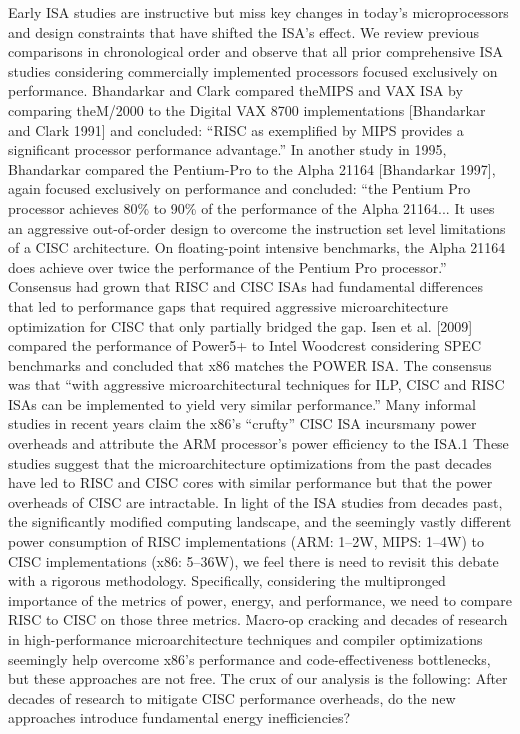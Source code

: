 Early ISA studies are instructive but miss key changes in today’s
microprocessors and design constraints that have shifted the ISA’s effect. We review
previous comparisons in chronological order and observe that all prior comprehensive
ISA studies considering commercially implemented processors focused exclusively on
performance.
Bhandarkar and Clark compared theMIPS and VAX ISA by comparing theM/2000 to
the Digital VAX 8700 implementations [Bhandarkar and Clark 1991] and concluded:
“RISC as exemplified by MIPS provides a significant processor performance advantage.”
In another study in 1995, Bhandarkar compared the Pentium-Pro to the Alpha
21164 [Bhandarkar 1997], again focused exclusively on performance and concluded:
“the Pentium Pro processor achieves 80\% to 90\% of the performance of the Alpha
21164... It uses an aggressive out-of-order design to overcome the instruction set level
limitations of a CISC architecture. On floating-point intensive benchmarks, the Alpha
21164 does achieve over twice the performance of the Pentium Pro processor.” Consensus
had grown that RISC and CISC ISAs had fundamental differences that led to
performance gaps that required aggressive microarchitecture optimization for CISC
that only partially bridged the gap.
Isen et al. [2009] compared the performance of Power5+ to Intel Woodcrest considering
SPEC benchmarks and concluded that x86 matches the POWER ISA. The
consensus was that “with aggressive microarchitectural techniques for ILP, CISC and
RISC ISAs can be implemented to yield very similar performance.”
Many informal studies in recent years claim the x86’s “crufty” CISC ISA incursmany
power overheads and attribute the ARM processor’s power efficiency to the ISA.1 These
studies suggest that the microarchitecture optimizations from the past decades have
led to RISC and CISC cores with similar performance but that the power overheads of
CISC are intractable.
In light of the ISA studies from decades past, the significantly modified computing
landscape, and the seemingly vastly different power consumption of RISC implementations
(ARM: 1–2W, MIPS: 1–4W) to CISC implementations (x86: 5–36W), we feel there
is need to revisit this debate with a rigorous methodology. Specifically, considering the
multipronged importance of the metrics of power, energy, and performance, we need to
compare RISC to CISC on those three metrics. Macro-op cracking and decades of research
in high-performance microarchitecture techniques and compiler optimizations
seemingly help overcome x86’s performance and code-effectiveness bottlenecks, but these approaches are not free. The crux of our analysis is the following: After decades
of research to mitigate CISC performance overheads, do the new approaches introduce
fundamental energy inefficiencies?